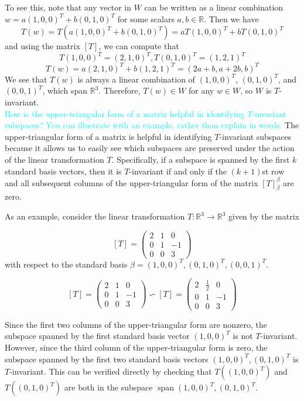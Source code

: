 \documentclass[fontsize=12pt]{scrartcl}
\begin{document}
To see this, note that any vector in $W$ can be written as a linear combination $w = a(1,0,0)^T + b(0,1,0)^T$ for some scalars $a,b\in\mathbb{R}$. Then we have
$$T(w)=T(a(1,0,0)^T+b(0,1,0)^T)=aT(1,0,0)^T+bT(0,1,0)^T$$
and using the matrix $[T]$, we can compute that
$$T(1,0,0)^T =(2,1,0)^T, T(0,1,0)^T =(1,2,1)^T$$
$$T(w)=a(2,1,0)^T+b(1,2,1)^T=(2a+b,a+2b,b)^T$$
We see that $T(w)$ is always a linear combination of $(1,0,0)^T$, $(0,1,0)^T$, and $(0,0,1)^T$, which span $\mathbb{R}^3$. Therefore, $T(w) \in W$ for any $w\in W$, so $W$ is $T$-invariant.
\\

\noindent
\textcolor{cyan}{How is the upper-triangular form of a matrix helpful in identifying $T$-invariant subspaces? You can illustrate with an example, rather than explain in words.}
\noindent
The upper-triangular form of a matrix is helpful in identifying $T$-invariant subspaces because it allows us to easily see which subspaces are preserved under the action of the linear transformation $T$. Specifically, if a subspace is spanned by the first $k$ standard basis vectors, then it is $T$-invariant if and only if the $(k+1)$st row and all subsequent columns of the upper-triangular form of the matrix $[T]_{\beta}^{\beta}$ are zero.

\noindent
As an example, consider the linear transformation $T:\mathbb{R}^3\to\mathbb{R}^3$ given by the matrix

$$[T] = \left( \begin{array}{ccc} 2 & 1& 0 \\ 0 & 1 & -1 \\ 0 & 0 & 3 \end{array} \right )$$
with respect to the standard basis $\beta = {(1,0,0)^T, (0,1,0)^T, (0,0,1)^T}$.

$$[T] = \left( \begin{array}{ccc} 2 & 1& 0 \\ 0 & 1 & -1 \\ 0 & 0 & 3 \end{array} \right ) \backsim [T] = \left( \begin{array}{ccc} 2 & \frac{1}{2} & 0 \\ 0 & 1 & -1 \\ 0 & 0 & 3 \end{array} \right )$$

\noindent
Since the first two columns of the upper-triangular form are nonzero, the subspace spanned by the first standard basis vector ${(1,0,0)^T}$ is not $T$-invariant. However, since the third column of the upper-triangular form is zero, the subspace spanned by the first two standard basis vectors ${(1,0,0)^T, (0,1,0)^T}$ is $T$-invariant. This can be verified directly by checking that $T((1,0,0)^T)$ and $T((0,1,0)^T)$ are both in the subspace $\operatorname{span}{(1,0,0)^T, (0,1,0)^T}$.
\end{document}
